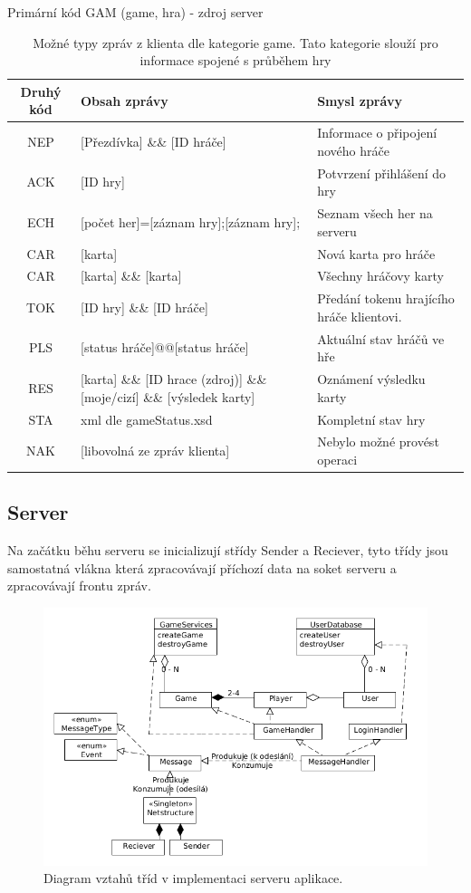 \documentclass[12pt, a4paper]{article}
\begin{document}
\begin{table}[H]%
\centering
Primární kód GAM (game, hra) - zdroj server
\begin{tabular}{|c | p{4cm} | p{5cm} |}
\hline
Druhý kód & Obsah zprávy & Smysl zprávy\\
\hline
NEP  & [Přezdívka]    \&\&    [ID hráče] & Informace o připojení nového hráče \\
\hline
ACK  &[ID hry] & Potvrzení přihlášení do hry\\
\hline
ECH &[počet her]=[záznam hry];[záznam hry]; & Seznam všech her na serveru \\
\hline
CAR &[karta] & Nová karta pro hráče \\
\hline
CAR &[karta]    \&\&    [karta] & Všechny hráčovy karty \\
\hline
TOK &[ID hry]    \&\&    [ID hráče] & Předání tokenu hrajícího hráče klientovi. \\
\hline
PLS & [status hráče]@@[status hráče] & Aktuální stav hráčů ve hře \\
\hline
RES &[karta]   \&\&   [ID hrace (zdroj)]   \&\&   [moje/cizí]   \&\&   [výsledek karty] & Oznámení výsledku karty \\
\hline
STA & xml dle gameStatus.xsd & Kompletní stav hry \\
\hline
NAK & [libovolná ze zpráv klienta] & Nebylo možné provést operaci \\
\hline

\end{tabular}
\label{tab:zpravyGamServer}
\caption{Možné typy zpráv z klienta dle kategorie game. Tato kategorie slouží pro informace spojené s průběhem hry}
\end{table}

\subsection{Server}

Na začátku běhu serveru se inicializují střídy Sender a Reciever, tyto třídy jsou samostatná vlákna která zpracovávají příchozí data na soket serveru a zpracovávají frontu zpráv.

\begin{figure}[ht]
\centering
\includegraphics[bb= 0 0 730 490 , width=12cm]{server.png}
\caption{Diagram vztahů tříd v implementaci serveru aplikace.}
\label{fig:game}
\end{figure}
\end{document}
